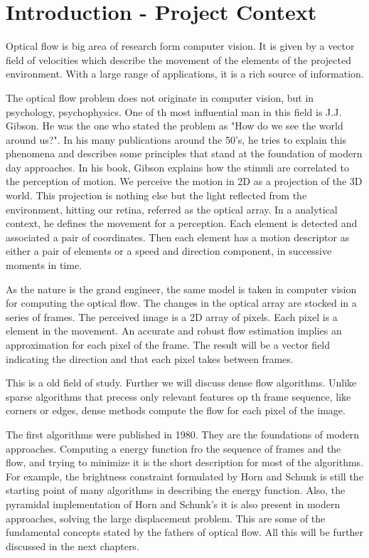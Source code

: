 \documentclass[12pt,a4paper,twoside]{report}
\begin{document}
\newpage

\tableofcontents
\newpage



\chapter{Introduction - Project Context}
\pagestyle{headings}
{\color{red}{must be about 3 pages}}

Optical flow is big area of research form computer vision. It is given by a vector field of velocities which describe the movement of the elements of the projected environment. With a large range of applications, it is a rich source of information. 

The optical flow problem does not originate in computer vision, but in psychology, psychophysics. One of th most influential man in this field is J.J. Gibson. He was the one who stated the problem as "How do we see the world around us?". In his many publications around the 50's, he tries to explain this phenomena and describes some principles that stand at the foundation of modern day approaches.  In his book\cite{gibson1950perception}, Gibson explains how the stimuli are correlated to the perception of motion. 
We perceive the motion in 2D as a projection of the 3D world. This projection is nothing else but the light reflected from the environment, hitting our retina, referred as the optical array. In a analytical context, he defines the movement for a perception. Each element is detected and associated a pair of coordinates. Then each element has a motion descriptor as either a pair of elements or a speed and direction component, in successive moments in time. 

As the nature is the grand engineer, the same model is taken in computer vision for computing the optical flow. The changes in the optical array are stocked in a series of frames. The perceived image is a 2D array of pixels. Each pixel is a element in the movement. An accurate and robust flow estimation implies an approximation for each pixel of the frame. The result will be a vector field indicating the direction and that each pixel takes between frames.
 
This is a old field of study.
Further we will discuss dense flow algorithms. Unlike sparse algorithms that precess only relevant features op th frame sequence, like corners or edges, dense methods compute the flow for each pixel of the image.

 The first algorithms were published in 1980. They are the foundations of modern approaches. Computing a energy function fro the sequence of frames and the flow, and trying to minimize it is the short description for most of the algorithms. For example, the brightness constraint formulated by Horn and Schunk is still the starting point of many algorithms in describing the energy function. Also, the pyramidal implementation of Horn and Schunk's it is also present in modern approaches, solving the large displacement problem. This are some of the fundamental concepts stated by the fathers of optical flow. All this will be further discussed in the next chapters.
  
\end{document}
